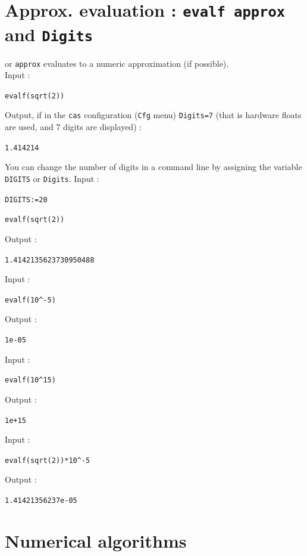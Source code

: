 \documentclass[a4paper,11pt]{book}
\begin{document}
\section{Approx. evaluation : {\tt evalf approx} and {\tt Digits}}
 or {\tt approx} evaluates to a numeric
approximation (if possible).\\
Input :
\begin{center}{\tt evalf(sqrt(2))}\end{center}
Output, if in the {\tt cas} configuration ({\tt Cfg} menu) {\tt Digits=7} 
(that is hardware floats are used, and 7 digits are displayed) :
\begin{center}{\tt 1.414214}\end{center}
You can change the number of digits in a command line by assigning 
the variable {\tt DIGITS} or {\tt Digits}.
Input :
\begin{center}{\tt DIGITS:=20}\end{center}
\begin{center}{\tt evalf(sqrt(2))}\end{center}
Output :
\begin{center}{\tt 1.4142135623730950488}\end{center}
Input : 
\begin{center}{\tt evalf(10\verb|^|-5)}\end{center}
Output :
\begin{center}{\tt 1e-05}\end{center}
Input :
\begin{center}{\tt evalf(10\verb|^|15)}\end{center}
Output :
\begin{center}{\tt 1e+15}\end{center}
Input : 
\begin{center}{\tt evalf(sqrt(2))*10\verb|^|-5}\end{center}
Output :
\begin{center}{\tt 1.41421356237e-05}\end{center}

\section{Numerical algorithms}
\end{document}
